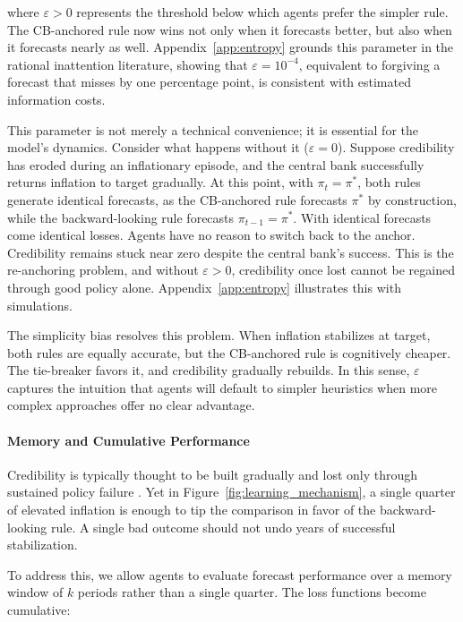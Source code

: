 \documentclass[10pt]{article}
\begin{document}
where $\varepsilon > 0$ represents the threshold below which agents prefer the simpler rule. The CB-anchored rule now wins not only when it forecasts better, but also when it forecasts nearly as well. Appendix~\ref{app:entropy} grounds this parameter in the rational inattention literature, showing that $\varepsilon = 10^{-4}$, equivalent to forgiving a forecast that misses by one percentage point, is consistent with estimated information costs.

This parameter is not merely a technical convenience; it is essential for the model's dynamics. Consider what happens without it ($\varepsilon = 0$). Suppose credibility has eroded during an inflationary episode, and the central bank successfully returns inflation to target gradually. At this point, with $\pi_t = \pi^*$, both rules generate identical forecasts, as the CB-anchored rule forecasts $\pi^*$ by construction, while the backward-looking rule forecasts $\pi_{t-1} = \pi^*$. With identical forecasts come identical losses. Agents have no reason to switch back to the anchor. Credibility remains stuck near zero despite the central bank's success. This is the re-anchoring problem, and without $\varepsilon > 0$, credibility once lost cannot be regained through good policy alone. Appendix~\ref{app:entropy} illustrates this with simulations.

The simplicity bias resolves this problem. When inflation stabilizes at target, both rules are equally accurate, but the CB-anchored rule is cognitively cheaper. The tie-breaker favors it, and credibility gradually rebuilds. In this sense, $\varepsilon$ captures the intuition that agents will default to simpler heuristics when more complex approaches offer no clear advantage.

\paragraph{Memory and Cumulative Performance}

Credibility is typically thought to be built gradually and lost only through sustained policy failure \citep{blinder2000}. Yet in Figure~\ref{fig:learning_mechanism}, a single quarter of elevated inflation is enough to tip the comparison in favor of the backward-looking rule. A single bad outcome should not undo years of successful stabilization.

To address this, we allow agents to evaluate forecast performance over a memory window of $k$ periods rather than a single quarter. The loss functions become cumulative:
  
\end{document}
